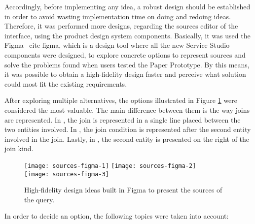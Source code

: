 Accordingly, before implementing any idea, a robust design should be established in order to avoid wasting implementation time on doing and redoing ideas. Therefore, it was performed more designs, regarding the sources editor of the interface, using the product design system components. Basically, it was used the Figma \ cite {figma}, which is a design tool where all the new Service Studio components were designed, to explore concrete options to represent sources and solve the problems found when users tested the Paper Prototype. By this means, it was possible to obtain a high-fidelity design faster and perceive what solution could most fit the existing requirements.

After exploring multiple alternatives, the options illustrated in Figure \ref{fig:sourcesFigma} were considered the most valuable. The main difference between them is the way joins are represented. In , the join is represented in a single line placed between the two entities involved. In , the join condition is represented after the second entity involved in the join. Lastly, in , the second entity is presented on the right of the join kind.

\begin{figure}[tb]
  \centering
    {\texttt{[image: sources-figma-1]}}%
    {\texttt{[image: sources-figma-2]}}%
    \\
  {\texttt{[image: sources-figma-3]}}%
\caption{High-fidelity design ideas built in Figma to present the sources of the query.}
  \label{fig:sourcesFigma}
\end{figure}

In order to decide an option, the following topics were taken into account:


